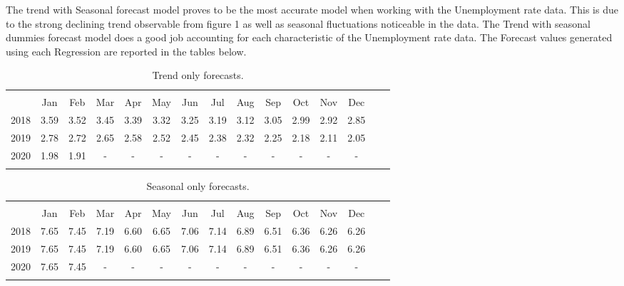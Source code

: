 \documentclass[12pt]{article}
\begin{document}
\break


The trend with Seasonal forecast model proves to be the most accurate model when working with the Unemployment rate data. This is due to the strong declining trend observable from figure 1 as well as seasonal fluctuations noticeable in the data. The Trend with seasonal dummies forecast model does a good job accounting for each characteristic of the Unemployment rate data. The Forecast values generated using each Regression are reported in the tables below.

\begin{table}[!htbp] \centering 
  \caption{Trend only forecasts.} 
  \label{} 
\begin{tabular}{@{\extracolsep{5pt}} ccccccccccccccc} 
\\[-1.8ex]\hline 
\hline \\[-1.8ex]          
& Jan & Feb & Mar & Apr & May & Jun & Jul & Aug & Sep & Oct & Nov & Dec \\                            
2018 & 3.59 & 3.52  & 3.45 & 3.39  & 3.32 & 3.25 & 3.19 &  3.12  & 3.05& 2.99  & 2.92 & 2.85 \\
2019 & 2.78 & 2.72 & 2.65 & 2.58  & 2.52 & 2.45 &  2.38  & 2.32 & 2.25 & 2.18  & 2.11  & 2.05 \\
2020 & 1.98 & 1.91 & - & - & - & - & - & - & - & - & - & - \\  
\hline \\[-1.8ex] 
\end{tabular} 
\end{table} 

\begin{table}[!htbp] \centering 
  \caption{Seasonal only forecasts.} 
  \label{} 
\begin{tabular}{@{\extracolsep{5pt}} ccccccccccccccc} 
\\[-1.8ex]\hline 
\hline \\[-1.8ex]          
& Jan & Feb & Mar & Apr & May & Jun & Jul & Aug & Sep & Oct & Nov & Dec \\                            
2018 & 7.65  & 7.45  & 7.19  & 6.60  & 6.65  & 7.06  & 7.14  & 6.89  & 6.51  & 6.36  & 6.26 & 6.26 \\
2019 & 7.65 & 7.45  & 7.19  & 6.60  & 6.65  & 7.06 & 7.14 & 6.89 &6.51 & 6.36  & 6.26 & 6.26  \\
2020 & 7.65 & 7.45  & - & - & - & - & - & - & - & - & - & - \\  
\hline \\[-1.8ex] 
\end{tabular} 
\end{table} 
\end{document}
